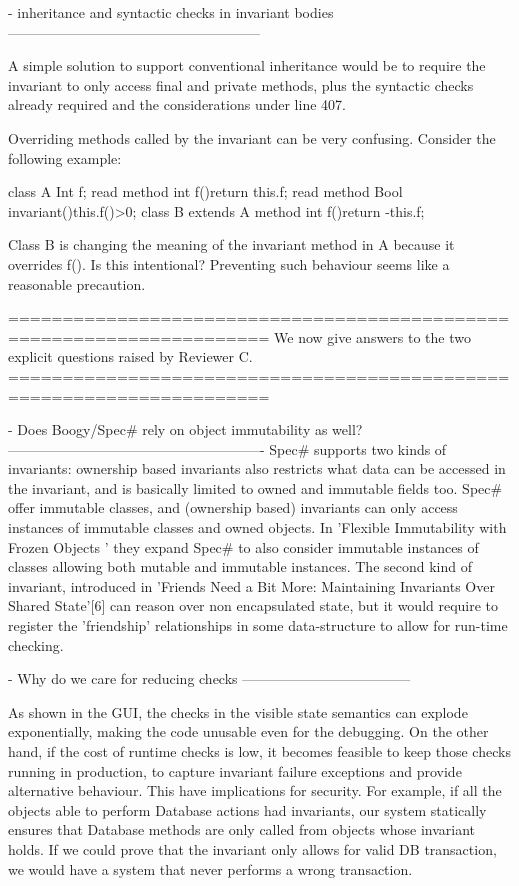 - inheritance and syntactic checks in invariant bodies
------------------------------------------------------

A simple solution to support conventional inheritance would be to require the invariant to only
access final and private methods,
plus the syntactic checks already required and the considerations under line 407.

Overriding methods called by the invariant can be very confusing.
Consider the following example:

class A{
  Int f;
  read method int f(){return this.f;}
  read method Bool invariant(){this.f()>0;}
}
class B extends A {
  method int f(){return -this.f;}
}

Class B is changing the meaning of the invariant method in A because it overrides f().
Is this intentional? Preventing such behaviour seems like a reasonable precaution.

======================================================================
We now give answers to the two explicit questions raised by Reviewer C.
======================================================================

- Does Boogy/Spec# rely on object immutability as well?
-------------------------------------------------------
Spec# supports two kinds of invariants:  ownership based invariants
 also restricts what data can be accessed in the invariant, and is basically limited
to owned and immutable fields too.
Spec# offer immutable classes, and (ownership based) invariants can only access instances of
immutable classes and owned objects. In 'Flexible Immutability with Frozen Objects
' they expand Spec# to also
consider immutable instances of classes allowing both mutable and immutable instances.
The second kind of invariant, introduced in 
'Friends Need a Bit More: Maintaining Invariants Over Shared State'[6]
 can reason over non encapsulated state, but it would
require to register the 'friendship' relationships in some data-structure
to allow for run-time checking.


- Why do we care for reducing checks
------------------------------------

As shown in the GUI, the checks in the visible state semantics can explode
exponentially, making the code unusable even for the debugging.
On the other hand, if the cost of runtime checks is low,
it becomes feasible to keep those checks running in production,
to capture invariant failure exceptions and provide alternative behaviour.
This have implications for security.
For example, if all the objects able to perform Database actions had invariants,
our system statically ensures that Database methods are only called from objects whose invariant holds.
If we could prove that the invariant only allows for valid DB transaction, we would have a system
that never performs a wrong transaction.

